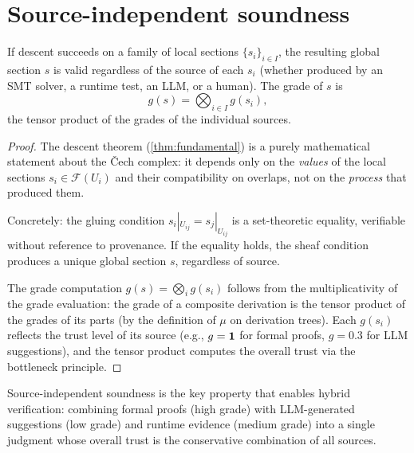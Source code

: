 \section{Source-independent soundness}
\label{sec:source-sound}

\begin{theorem}
\label{thm:source-sound}
If descent succeeds on a family of local sections
$\{s_i\}_{i \in I}$, the resulting global section $s$ is valid
regardless of the source of each $s_i$ (whether produced by an SMT
solver, a runtime test, an LLM, or a human).  The grade of $s$ is
\[
  g(s) = \bigotimes_{i \in I} g(s_i),
\]
the tensor product of the grades of the individual sources.
\end{theorem}

\begin{proof}
The descent theorem (\cref{thm:fundamental}) is a purely mathematical
statement about the \v{C}ech complex: it depends only on the
\emph{values} of the local sections $s_i \in \mathcal{F}(U_i)$ and
their compatibility on overlaps, not on the \emph{process} that
produced them.

Concretely: the gluing condition
$s_i|_{U_{ij}} = s_j|_{U_{ij}}$ is a set-theoretic equality,
verifiable without reference to provenance.  If the equality holds,
the sheaf condition produces a unique global section $s$,
regardless of source.

The grade computation $g(s) = \bigotimes_i g(s_i)$ follows from the
multiplicativity of the grade evaluation: the grade of a composite
derivation is the tensor product of the grades of its parts
(by the definition of $\mu$ on derivation trees).  Each $g(s_i)$
reflects the trust level of its source (e.g., $g = \mathbf{1}$ for
formal proofs, $g = 0.3$ for LLM suggestions), and the tensor
product computes the overall trust via the bottleneck principle.
\end{proof}

\begin{remark}
Source-independent soundness is the key property that enables
hybrid verification: combining formal proofs (high grade) with
LLM-generated suggestions (low grade) and runtime evidence (medium
grade) into a single judgment whose overall trust is the
conservative combination of all sources.
\end{remark}
